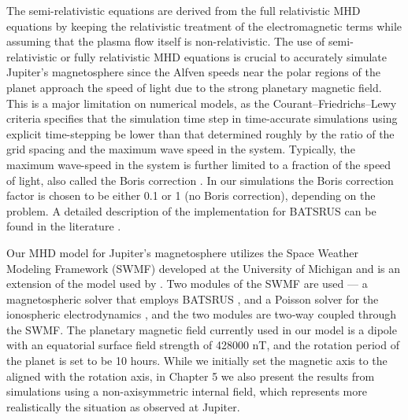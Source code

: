 The semi-relativistic equations are derived from the full relativistic MHD equations \cite{Gombosi2002b} by keeping the relativistic treatment of the electromagnetic terms while assuming that the plasma flow itself is non-relativistic. The use of semi-relativistic or fully relativistic MHD equations is crucial to accurately simulate Jupiter's magnetosphere since the Alfven speeds near the polar regions of the planet approach the speed of light due to the strong planetary magnetic field. This is a major limitation on numerical models, as the Courant–Friedrichs–Lewy criteria specifies that the simulation time step in time-accurate simulations using explicit time-stepping be lower than that determined roughly by the ratio of the grid spacing and the maximum wave speed in the system. Typically, the maximum wave-speed in the system is further limited to a fraction of the speed of light, also called the Boris correction \cite{Toth2011}. In our simulations the Boris correction factor is chosen to be either 0.1 or 1 (no Boris correction), depending on the problem. A detailed description of the implementation for BATSRUS can be found in the literature \cite{Gombosi2002b, Toth2012a}.

Our MHD model for Jupiter's magnetosphere utilizes the Space Weather Modeling Framework (SWMF) developed at the University of Michigan \cite{Toth2012a} and is an extension of the model used by \cite{Hansen2001a}. Two modules of the SWMF are used — a magnetospheric solver that employs BATSRUS \cite{Gombosi2002b,Powell1999a}, and a Poisson solver for the ionospheric electrodynamics \cite{Ridley2004IonosphericConductance}, and the two modules are two‐way coupled through the SWMF.  The planetary magnetic field currently used in our model is a dipole with an equatorial surface field strength of 428000 nT, and the rotation period of the planet is set to be 10 hours. While we initially set the magnetic axis to the aligned with the rotation axis, in Chapter 5 we also present the results from simulations using a non-axisymmetric internal field, which represents more realistically the situation as observed at Jupiter. 

